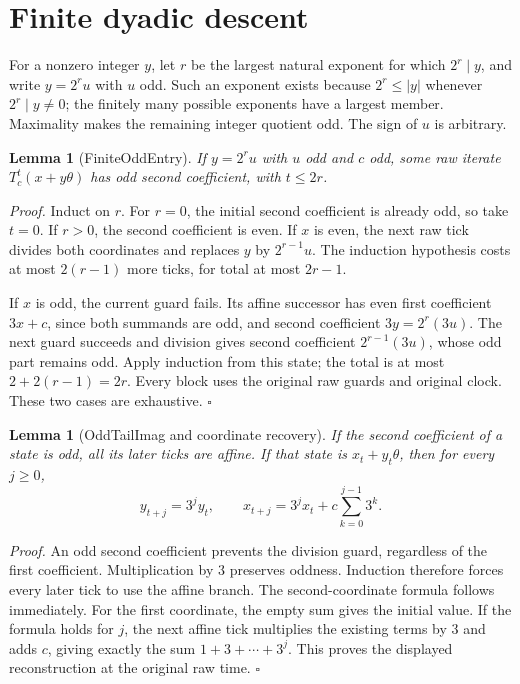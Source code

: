 \documentclass[11pt,letterpaper]{article}
\newtheorem{lemma}[theorem]{Lemma}
\newenvironment{proof}{\noindent\textit{Proof.}}{\hfill\(\square\)}
\begin{document}
\section{Finite dyadic descent}

For a nonzero integer \(y\), let \(r\) be the largest natural exponent for which \(2^r\mid y\), and write \(y=2^r u\) with \(u\) odd. Such an exponent exists because \(2^r\le|y|\) whenever \(2^r\mid y\ne0\); the finitely many possible exponents have a largest member. Maximality makes the remaining integer quotient odd. The sign of \(u\) is arbitrary.

\begin{lemma}[FiniteOddEntry]
If \(y=2^r u\) with \(u\) odd and \(c\) odd, some raw iterate \(T_c^t(x+y\theta)\) has odd second coefficient, with \(t\le2r\).
\end{lemma}
\begin{proof}
Induct on \(r\). For \(r=0\), the initial second coefficient is already odd, so take \(t=0\). If \(r>0\), the second coefficient is even. If \(x\) is even, the next raw tick divides both coordinates and replaces \(y\) by \(2^{r-1}u\). The induction hypothesis costs at most \(2(r-1)\) more ticks, for total at most \(2r-1\).

If \(x\) is odd, the current guard fails. Its affine successor has even first coefficient \(3x+c\), since both summands are odd, and second coefficient \(3y=2^r(3u)\). The next guard succeeds and division gives second coefficient \(2^{r-1}(3u)\), whose odd part remains odd. Apply induction from this state; the total is at most \(2+2(r-1)=2r\). Every block uses the original raw guards and original clock. These two cases are exhaustive.
\end{proof}

\begin{lemma}[OddTailImag and coordinate recovery]
If the second coefficient of a state is odd, all its later ticks are affine. If that state is \(x_t+y_t\theta\), then for every \(j\ge0\),
\[
y_{t+j}=3^j y_t,
\qquad x_{t+j}=3^j x_t+c\sum_{k=0}^{j-1}3^k.
\]
\end{lemma}
\begin{proof}
An odd second coefficient prevents the division guard, regardless of the first coefficient. Multiplication by \(3\) preserves oddness. Induction therefore forces every later tick to use the affine branch. The second-coordinate formula follows immediately. For the first coordinate, the empty sum gives the initial value. If the formula holds for \(j\), the next affine tick multiplies the existing terms by \(3\) and adds \(c\), giving exactly the sum \(1+3+\cdots+3^j\). This proves the displayed reconstruction at the original raw time.
\end{proof}
\end{document}
